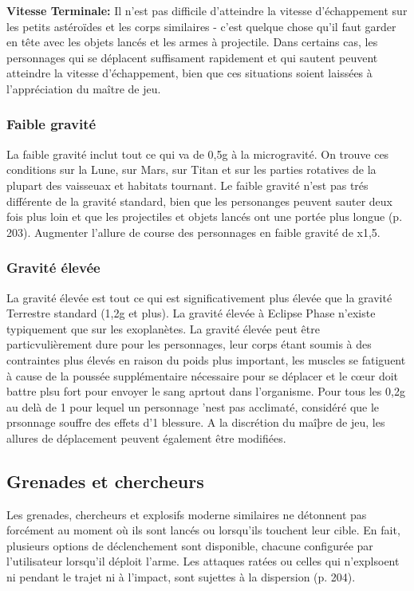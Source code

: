 \textbf{Vitesse Terminale:} Il n'est pas difficile d'atteindre la vitesse d'échappement sur les petits astéroïdes et les corps similaires - c'est quelque chose qu'il faut garder en tête avec les objets lancés et les armes à projectile. Dans certains cas, les personnages qui se déplacent suffisament rapidement et qui sautent peuvent atteindre la vitesse d'échappement, bien que ces situations soient laissées à l'appréciation du maître de jeu. 

\subsubsection{Faible gravité} 

La faible gravité inclut tout ce qui va de 0,5g à la microgravité. On trouve ces conditions sur la Lune, sur Mars, sur Titan et sur les parties rotatives de la plupart des vaisseuax et habitats tournant. Le faible gravité n'est pas trés différente de la gravité standard, bien que les personanges peuvent sauter deux fois plus loin et que les projectiles et objets lancés ont une portée plus longue (p. 203). Augmenter l'allure de course des personnages en faible gravité de x1,5. 

\subsubsection{Gravité élevée} 

La gravité élevée est tout ce qui est significativement plus élevée que la gravité Terrestre standard (1,2g et plus). La gravité élevée à Eclipse Phase n'existe typiquement que sur les exoplanètes. La gravité élevée peut être particvulièrement dure pour les personnages, leur corps étant soumis à des contraintes plus élevés en raison du poids plus important, les muscles se fatiguent à cause de la poussée supplémentaire nécessaire pour se déplacer et le cœur doit battre plsu fort pour envoyer le sang aprtout dans l'organisme. Pour tous les 0,2g au delà de 1 pour lequel un personnage 'nest pas acclimaté, considéré que le prsonnage souffre des effets d'1 blessure. A la discrétion du maîþre de jeu, les allures de déplacement peuvent également être modifiées. 

\subsection{Grenades et chercheurs} \label{sec:combat-grenades-seekers} 

Les grenades, chercheurs et explosifs moderne similaires ne détonnent pas forcément au moment où ils sont lancés ou lorsqu'ils touchent leur cible. En fait, plusieurs options de déclenchement sont disponible, chacune configurée par l'utilisateur lorsqu'il déploit l'arme. Les attaques ratées ou celles qui n'explsoent ni pendant le trajet ni à l'impact, sont sujettes à la dispersion (p. 204). 

